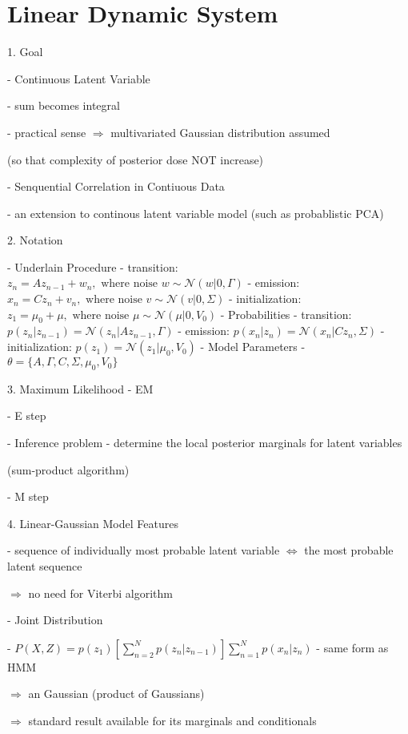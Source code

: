 \section{Linear Dynamic System}

1. Goal

   - Continuous Latent Variable

     - sum becomes integral

     - practical sense $\Rightarrow$ multivariated Gaussian distribution assumed

       (so that complexity of posterior dose NOT increase)

   - Senquential Correlation in Contiuous Data

     - an extension to continous latent variable model (such as probablistic PCA)

2. Notation

   - Underlain Procedure
     - transition: $z_n = A z_{n-1} + w_n, \text{ where noise } w \sim \mathcal N(w|0,\Gamma)$ 
     - emission: $x_n = Cz_n + v_n, \text{ where noise } v \sim \mathcal N(v|0,\Sigma)$
     - initialization: $z_1 = \mu_0 + \mu, \text{ where noise } \mu \sim \mathcal N (\mu|0,V_0)$ 
   - Probabilities
     - transition: $p(z_n|z_{n-1}) = \mathcal N (z_n|Az_{n-1}, \Gamma)$   
     - emission: $p(x_n|z_n) = \mathcal N (x_n|C z_n,\Sigma)$ 
     - initialization: $p(z_1) = \mathcal N(z_1|\mu_0,V_0)$  
   - Model Parameters
     - $\theta = \{ A,\Gamma,C,\Sigma,\mu_0,V_0 \}$ 

3. Maximum Likelihood - EM

   - E step 

     - Inference problem - determine the local posterior marginals for latent variables 

       (sum-product algorithm)

   - M step

4. Linear-Gaussian Model Features

   - sequence of individually most probable latent variable $\Leftrightarrow$ the most probable latent sequence

     $\Rightarrow$ no need for Viterbi algorithm

   - Joint Distribution

     - $\displaystyle P(X,Z) = p(z_1) \left[ \sum_{n=2}^Np(z_n|z_{n-1}) \right] \sum_{n=1}^N p(x_n|z_n)$  - same form as HMM

       $\Rightarrow$ an Gaussian (product of Gaussians)

       $\Rightarrow$ standard result available for its marginals and conditionals 


